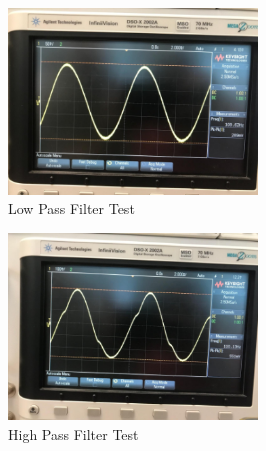 \documentclass{article}
\begin{document}
\begin{figure}[h]
\begin{center}
\includegraphics[width=250px]{LowPassFilterTest.png}
\caption{Low Pass Filter Test}
\end{center}
\end{figure}

\begin{figure}[h]
\begin{center}
\includegraphics[width=250px]{HighPassFilterTest.png}
\caption{High Pass Filter Test}
\end{center}
\end{figure}
\end{document}
